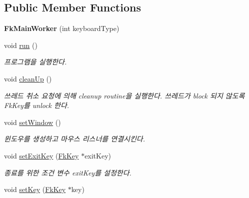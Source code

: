 \subsection*{Public Member Functions}
\begin{DoxyCompactItemize}
\item 
\hypertarget{class_fk_main_worker_af55f062a573852edb7a6af03bcf72d88}{}{\bfseries Fk\+Main\+Worker} (int keyboard\+Type)\label{class_fk_main_worker_af55f062a573852edb7a6af03bcf72d88}

\item 
\hypertarget{class_fk_main_worker_a96b51901716888eecd0af94489a1a5a6}{}void \hyperlink{class_fk_main_worker_a96b51901716888eecd0af94489a1a5a6}{run} ()\label{class_fk_main_worker_a96b51901716888eecd0af94489a1a5a6}

\begin{DoxyCompactList}\small\item\em 프로그램을 실행한다. \end{DoxyCompactList}\item 
\hypertarget{class_fk_main_worker_abdafdb0a1bfc3672ce7e0ccb30effc39}{}void \hyperlink{class_fk_main_worker_abdafdb0a1bfc3672ce7e0ccb30effc39}{clean\+Up} ()\label{class_fk_main_worker_abdafdb0a1bfc3672ce7e0ccb30effc39}

\begin{DoxyCompactList}\small\item\em 쓰레드 취소 요청에 의해 cleanup routine을 실행한다. 쓰레드가 block 되지 않도록 Fk\+Key를 unlock 한다. \end{DoxyCompactList}\item 
\hypertarget{class_fk_main_worker_abbab549d802e3883b2c8b124c4aa35b6}{}void \hyperlink{class_fk_main_worker_abbab549d802e3883b2c8b124c4aa35b6}{set\+Window} ()\label{class_fk_main_worker_abbab549d802e3883b2c8b124c4aa35b6}

\begin{DoxyCompactList}\small\item\em 윈도우를 생성하고 마우스 리스너를 연결시킨다. \end{DoxyCompactList}\item 
\hypertarget{class_fk_main_worker_aceded7bf8371707024e7218521c7a12e}{}void \hyperlink{class_fk_main_worker_aceded7bf8371707024e7218521c7a12e}{set\+Exit\+Key} (\hyperlink{class_fk_key}{Fk\+Key} $\ast$exit\+Key)\label{class_fk_main_worker_aceded7bf8371707024e7218521c7a12e}

\begin{DoxyCompactList}\small\item\em 종료를 위한 조건 변수 exit\+Key를 설정한다. \end{DoxyCompactList}\item 
\hypertarget{class_fk_main_worker_a7aec87f8b9cc587fb6465f55ca1401f1}{}void \hyperlink{class_fk_main_worker_a7aec87f8b9cc587fb6465f55ca1401f1}{set\+Key} (\hyperlink{class_fk_key}{Fk\+Key} $\ast$key)\label{class_fk_main_worker_a7aec87f8b9cc587fb6465f55ca1401f1}


\end{DoxyCompactItemize}
